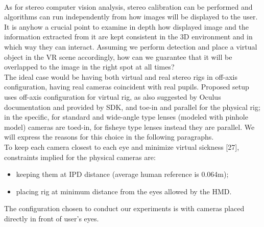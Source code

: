\\
As for stereo computer vision analysis, stereo calibration can be performed and algorithms can run independently from how images will be displayed to the user. It is anyhow a crucial point to examine in depth how displayed image and the information extracted from it are kept consistent in the 3D environment and in which way they can interact. Assuming we perform detection and place a virtual object in the VR scene accordingly, how can we guarantee that it will be overlapped to the image in the right spot at all times?\\
The ideal case would be having both virtual and real stereo rigs in off-axis configuration, having real cameras coincident with real pupils. Proposed setup uses off-axis configuration for virtual rig, as also suggested by Oculus documentation and provided by SDK, and toe-in and parallel for the physical rig; in the specific, for standard and wide-angle type lenses (modeled with pinhole model) cameras are toed-in, for fisheye type lenses instead they are parallel. We will express the reasons for this choice in the following paragraphs.\\
To keep each camera closest to each eye and minimize virtual sickness [27], constraints implied for the physical cameras are:
\begin{itemize}
\item keeping them at IPD distance (average human reference is 0.064m);
\item placing rig at minimum distance from the eyes allowed by the HMD.
\end{itemize}
The configuration chosen to conduct our experiments is with cameras placed directly in front of user's eyes.

